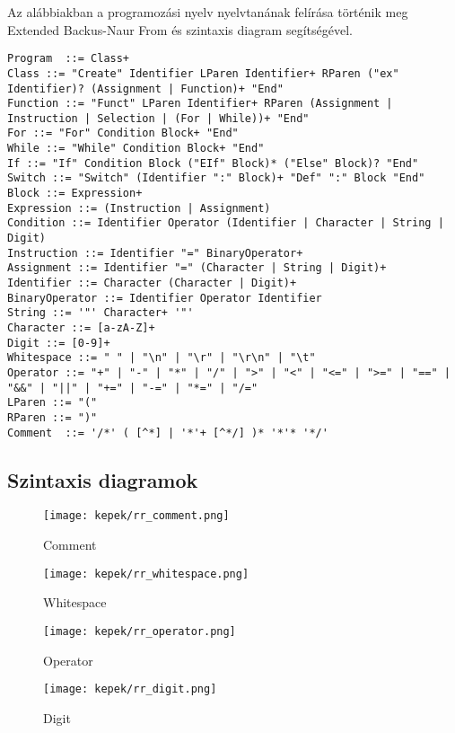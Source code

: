 Az alábbiakban a programozási nyelv nyelvtanának felírása történik meg Extended Backus-Naur From és szintaxis diagram segítségével.

\begin{verbatim}
Program  ::= Class+
Class ::= "Create" Identifier LParen Identifier+ RParen ("ex" Identifier)? (Assignment | Function)+ "End"
Function ::= "Funct" LParen Identifier+ RParen (Assignment | Instruction | Selection | (For | While))+ "End"
For ::= "For" Condition Block+ "End"
While ::= "While" Condition Block+ "End"
If ::= "If" Condition Block ("EIf" Block)* ("Else" Block)? "End"
Switch ::= "Switch" (Identifier ":" Block)+ "Def" ":" Block "End"
Block ::= Expression+
Expression ::= (Instruction | Assignment)
Condition ::= Identifier Operator (Identifier | Character | String | Digit)
Instruction ::= Identifier "=" BinaryOperator+
Assignment ::= Identifier "=" (Character | String | Digit)+
Identifier ::= Character (Character | Digit)+
BinaryOperator ::= Identifier Operator Identifier
String ::= '"' Character+ '"'
Character ::= [a-zA-Z]+
Digit ::= [0-9]+
Whitespace ::= " " | "\n" | "\r" | "\r\n" | "\t"
Operator ::= "+" | "-" | "*" | "/" | ">" | "<" | "<=" | ">=" | "==" | "&&" | "||" | "+=" | "-=" | "*=" | "/="
LParen ::= "("
RParen ::= ")"
Comment  ::= '/*' ( [^*] | '*'+ [^*/] )* '*'* '*/'

\end{verbatim}

\subsection{Szintaxis diagramok}

\begin{figure}[h!]
\centering
\texttt{[image: kepek/rr\_comment.png]}
\caption{Comment}
\label{fig:rr_comment}
\end{figure}

\begin{figure}[h!]
\centering
\texttt{[image: kepek/rr\_whitespace.png]}
\caption{Whitespace}
\label{fig:rr_whitespace}
\end{figure}

\begin{figure}[h!]
\centering
\texttt{[image: kepek/rr\_operator.png]}
\caption{Operator}
\label{fig:rr_operator}
\end{figure}

\begin{figure}[h!]
\centering
\texttt{[image: kepek/rr\_digit.png]}
\caption{Digit}
\label{fig:rr_digit}
\end{figure}

